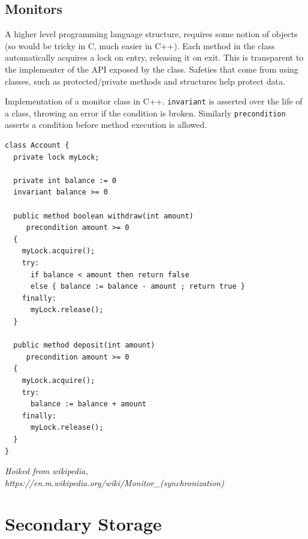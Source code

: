 \documentclass[a4]{article}
\begin{document}
\subsection{Monitors}

A higher level programming language structure, requires some notion of objects (so would be tricky 
in C, much easier in C++). Each method in the class automatically acquires a lock on entry, 
releasing it on exit. This is transparent to the implementer of the API exposed by the class. 
Safeties that come from using classes, such as protected/private methods and structures help protect data.

Implementation of a monitor class in C++. \verb|invariant| is asserted over the life of a class, throwing an
error if the condition is broken. Similarly \verb|precondition| asserts a condition before method
execution is allowed. 

\begin{verbatim}
class Account {
  private lock myLock;

  private int balance := 0
  invariant balance >= 0

  public method boolean withdraw(int amount)
     precondition amount >= 0
  {
    myLock.acquire();
    try:
      if balance < amount then return false
      else { balance := balance - amount ; return true }
    finally:
      myLock.release();
  }

  public method deposit(int amount)
     precondition amount >= 0
  {
    myLock.acquire();
    try:
      balance := balance + amount
    finally:
      myLock.release();
  }
}
\end{verbatim}
\emph{Hoiked from wikipedia, https://en.m.wikipedia.org/wiki/Monitor\_(synchronization)}


\section{Secondary Storage}
\end{document}
